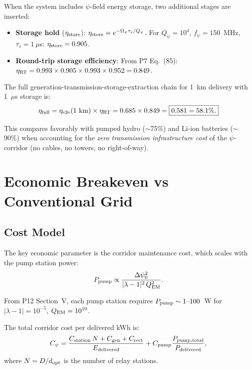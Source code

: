 \documentclass[aps,prd,twocolumn,superscriptaddress]{revtex4-2}
\newcommand{\Qpsi}{Q_\psi}
\newcommand{\Opsi}{\Omega_\psi}
\begin{document}
When the system includes $\psi$-field energy storage, two additional
stages are inserted:

\begin{itemize}
\item \textbf{Storage hold} ($\eta_{\rm store}$):
$\eta_{\rm store} = e^{-\Opsi\tau_s/\Qpsi}$.
For $\Qpsi = 10^4$, $f_\psi = 150$~MHz, $\tau_s = 1~\mu$s:
$\eta_{\rm store} = 0.905$.

\item \textbf{Round-trip storage efficiency}: From P7 Eq.~(85):
$\eta_{\rm RT} = 0.993 \times 0.905 \times 0.993 \times 0.952 = 0.849$.
\end{itemize}

The full generation-transmission-storage-extraction chain for 1~km
delivery with 1~$\mu$s storage is:
\begin{equation}
\eta_{\rm full} = \eta_{\rm e2e}(1~\text{km}) \times \eta_{\rm RT}
= 0.685 \times 0.849 = \boxed{0.581 = 58.1\%.}
\end{equation}

This compares favorably with pumped hydro ($\sim$75\%) and Li-ion
batteries ($\sim$90\%) when accounting for the \emph{zero transmission
infrastructure cost} of the $\psi$-corridor (no cables, no towers, no
right-of-way).

\section{Economic Breakeven vs Conventional Grid}
\label{sec:breakeven}

\subsection{Cost Model}

The key economic parameter is the corridor maintenance cost, which
scales with the pump station power:
\begin{equation}
P_{\rm pump} \propto \frac{\Delta\psi_0^2}{|\lambda-1|^2\,Q_{\rm EM}^2}.
\end{equation}

From P12 Section~V, each pump station requires $P_{\rm pump} \sim
1\text{--}100$~W for $|\lambda-1| = 10^{-5}$, $Q_{\rm EM} = 10^{10}$.

The total corridor cost per delivered kWh is:
\begin{equation}
C_{\psi} = \frac{C_{\rm station}\,N + C_{\rm gen} + C_{\rm rect}}{E_{\rm delivered}}
+ C_{\rm pump}\frac{P_{\rm pump,total}}{P_{\rm delivered}},
\end{equation}
where $N = D/d_{\rm opt}$ is the number of relay stations.
\end{document}
